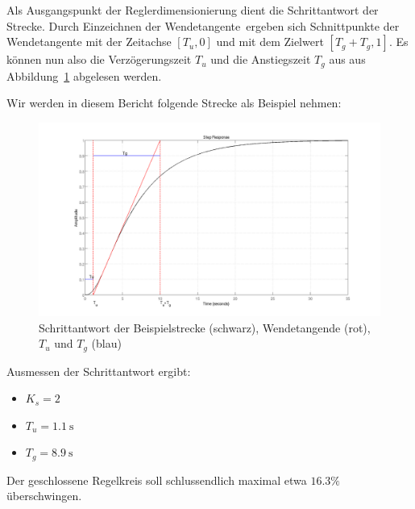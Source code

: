 Als  Ausgangspunkt  der  Reglerdimensionierung dient  die  Schrittantwort  der
Strecke. Durch  Einzeichnen  der Wendetangente~\footnotemark[1]  ergeben  sich
Schnittpunkte  der  Wendetangente mit  der  Zeitachse  $[T_u,0]$ und  mit  dem
Zielwert  $[T_g+T_g,1]$.  Es  k\"onnen nun  also die  Verz\"ogerungszeit $T_u$
und die  Anstiegszeit $T_g$  aus aus  Abbildung~\ref{fig:plant_step} abgelesen
werden.


Wir werden in diesem Bericht folgende Strecke als Beispiel nehmen:
\begin{figure}[h! width=\pagewidth]
    \includegraphics[width=\textwidth]{images/streckeSchrittantwort.png}
    \caption{%
    Schrittantwort der  Beispielstrecke (schwarz), Wendetangende  (rot), $T_u$
    und $T_g$ (blau)
    }
    \label{fig:plant_step}
\end{figure}

Ausmessen der Schrittantwort ergibt:
\begin{itemize}
    \item
        $K_s = 2$~\footnotemark[2]
    \item
        $T_u = \SI{1.1}{\second}$
    \item
        $T_g = \SI{8.9}{\second}$
\end{itemize}


Der  geschlossene   Regelkreis  soll  schlussendlich  maximal   etwa  $16.3\%$
\"uberschwingen.

